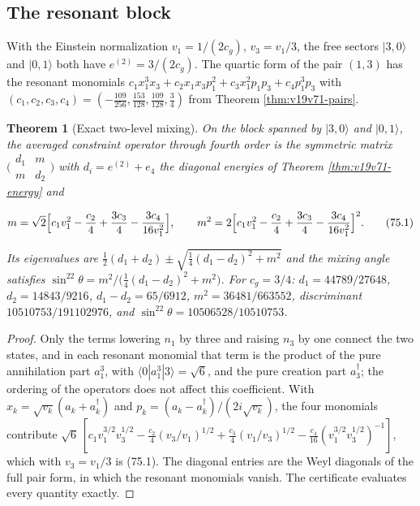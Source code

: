 \documentclass[11pt]{article}
\newtheorem{theorem}{Theorem}[section]
\theoremstyle{remark}
\begin{document}
\subsection{The resonant block}

With the Einstein normalization \(v_1=1/(2c_g)\), \(v_3=v_1/3\), the
free sectors \(|3,0\rangle\) and \(|0,1\rangle\) both have
\(e^{(2)}=3/(2c_g)\).  The quartic form of the pair \((1,3)\) has the
resonant monomials
\(c_1x_1^3x_3+c_2x_1x_3p_1^2+c_3x_1^2p_1p_3+c_4p_1^3p_3\) with
\((c_1,c_2,c_3,c_4)=(-\tfrac{109}{256},\tfrac{153}{128},\tfrac{109}{128},\tfrac34)\)
from Theorem \ref{thm:v19v71-pairs}.

\begin{theorem}[Exact two-level mixing]
\label{thm:v19v72-mixing}
On the block spanned by \(|3,0\rangle\) and \(|0,1\rangle\), the
averaged constraint operator through fourth order is the symmetric
matrix \(\bigl(\begin{smallmatrix}d_1&m\\m&d_2\end{smallmatrix}\bigr)\)
with \(d_i=e^{(2)}+e_4\) the diagonal energies of Theorem
\ref{thm:v19v71-energy} and

\[
 m=\sqrt2\Bigl[c_1v_1^2-\frac{c_2}4+\frac{3c_3}4-\frac{3c_4}{16v_1^2}\Bigr],
 \qquad
 m^2=2\Bigl[c_1v_1^2-\frac{c_2}4+\frac{3c_3}4-\frac{3c_4}{16v_1^2}\Bigr]^2.
                                                                    \tag{75.1}
\]

Its eigenvalues are \(\tfrac12(d_1+d_2)\pm\sqrt{\tfrac14(d_1-d_2)^2+m^2}\)
and the mixing angle satisfies
\(\sin^22\theta=m^2/\bigl(\tfrac14(d_1-d_2)^2+m^2\bigr)\).  For
\(c_g=3/4\): \(d_1=44789/27648\), \(d_2=14843/9216\),
\(d_1-d_2=65/6912\), \(m^2=36481/663552\), discriminant
\(10510753/191102976\), and \(\sin^22\theta=10506528/10510753\).
\end{theorem}

\begin{proof}
Only the terms lowering \(n_1\) by three and raising \(n_3\) by one
connect the two states, and in each resonant monomial that term is the
product of the pure annihilation part \(a_1^3\), with
\(\langle0|a_1^3|3\rangle=\sqrt6\), and the pure creation part
\(a_3^\dagger\); the ordering of the operators does not affect this
coefficient.  With \(x_k=\sqrt{v_k}(a_k+a_k^\dagger)\) and
\(p_k=(a_k-a_k^\dagger)/(2i\sqrt{v_k})\), the four monomials contribute
\(\sqrt6\,[c_1v_1^{3/2}v_3^{1/2}-\tfrac{c_2}4(v_3/v_1)^{1/2}+\tfrac{c_3}4(v_1/v_3)^{1/2}-\tfrac{c_4}{16}(v_1^{3/2}v_3^{1/2})^{-1}]\),
which with \(v_3=v_1/3\) is (75.1).  The diagonal entries are the
Weyl diagonals of the full pair form, in which the resonant monomials
vanish.  The certificate evaluates every quantity exactly.
\end{proof}
\end{document}

